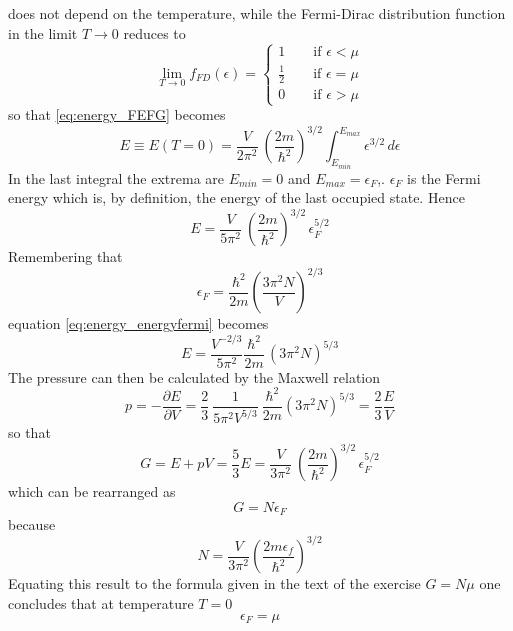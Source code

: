 \documentclass{article}
\begin{document}
does not depend on the temperature, while the Fermi-Dirac distribution function in the limit $T \to 0$ reduces to 
\begin{equation}
    \lim_{T \to 0} f_{FD}(\epsilon) = 
    \begin{cases}
        1 \qquad \text{if } \epsilon < \mu \\
        \frac{1}{2} \qquad \text{if } \epsilon = \mu \\ 
        0 \qquad \text{if } \epsilon > \mu
    \end{cases}
\end{equation}
so that \ref{eq:energy_FEFG} becomes 
\begin{equation*}
    E \equiv E(T=0) = \frac{V}{2\pi^2} \ \left(\frac{2m}{\hbar^2}\right)^{3/2} \int_{E_{min}}^{E_{max}} \epsilon^{3/2} \, d\epsilon
\end{equation*}
In the last integral the extrema are $E_{min} = 0$ and $E_{max} = \epsilon_F$,. $\epsilon_F$ is the Fermi energy which is, by definition, the energy of 
the last occupied state. Hence
\begin{equation}
    E = \frac{V}{5\pi^2} \ \left(\frac{2m}{\hbar^2}\right)^{3/2} \, \epsilon_F^{5/2}
    \label{eq:energy_energyfermi}
\end{equation}
Remembering that
\begin{equation*}
    \epsilon_F = \frac{\hbar^2}{2m} \left(\frac{3\pi^2N}{V}\right)^{2/3}
\end{equation*}
equation \ref{eq:energy_energyfermi} becomes
\begin{equation*}
    E = \frac{V^{-2/3}}{5\pi^2} \frac{\hbar^2}{2m} \, (3\pi^2N)^{5/3}
\end{equation*}
The pressure can then be calculated by the Maxwell relation 
$$p = -\frac{\partial E}{\partial V} = \frac{2}{3} \ \frac{1}{5\pi^2 V^{5/3}} \ \frac{\hbar^2}{2m} (3\pi^2N)^{5/3} = \frac{2}{3}\frac{E}{V}$$
so that 
$$G = E + pV = \frac{5}{3} E = \frac{V}{3\pi^2} \ \left(\frac{2m}{\hbar^2}\right)^{3/2} \, \epsilon_F^{5/2}$$
which can be rearranged as
$$G = N \epsilon_F$$
because 
\begin{equation*}
    N = \frac{V}{3\pi^2} \left(\frac{2m\epsilon_f}{\hbar^2}\right)^{3/2}
\end{equation*}
Equating this result to the formula given in the text of the exercise $G = N\mu$ one concludes that at temperature $T=0$ 
\begin{equation}
    \epsilon_F = \mu
\end{equation}
\end{document}
